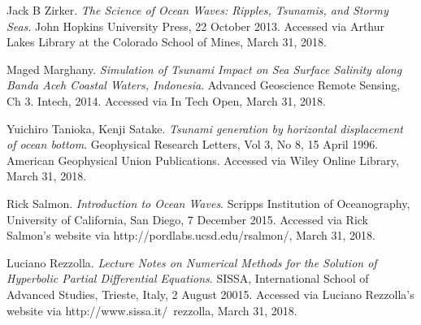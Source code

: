 \documentclass[12pt,a4]{article}
\begin{document}
\begin{thebibliography}{1}
Jack B Zirker.
\textit{The Science of Ocean Waves: Ripples, Tsunamis, and Stormy Seas}.
John Hopkins University Press, 22 October 2013. 
Accessed via Arthur Lakes Library at the Colorado School of Mines, March 31, 2018.
    
Maged Marghany.
\textit{Simulation of Tsunami Impact on Sea Surface Salinity along Banda Aceh Coastal Waters, Indonesia}.
Advanced Geoscience Remote Sensing, Ch 3. Intech, 2014. Accessed via In Tech Open, March 31, 2018.
    
Yuichiro Tanioka, Kenji Satake.
\textit{Tsunami generation by horizontal displacement of ocean bottom}.
Geophysical Research Letters, Vol 3, No 8, 15 April 1996. American Geophysical Union Publications. Accessed via Wiley Online Library, March 31, 2018.

Rick Salmon.
\textit{Introduction to Ocean Waves}.
Scripps Institution of Oceanography, University of California, San Diego, 7 December 2015. Accessed via Rick Salmon's website via http://pordlabs.ucsd.edu/rsalmon/, March 31, 2018.

Luciano Rezzolla.
\textit{Lecture Notes on Numerical Methods for the Solution of Hyperbolic Partial Differential Equations}.
SISSA, International School of Advanced Studies, Trieste, Italy, 2 August 20015. Accessed via Luciano Rezzolla's website via http://www.sissa.it/~rezzolla, March 31, 2018.

\end{thebibliography}
	
\end{document}
